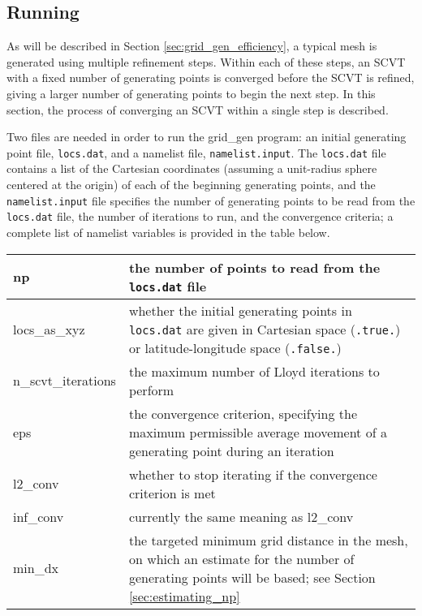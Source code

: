 \subsection{Running}

As will be described in Section \ref{sec:grid_gen_efficiency}, a typical mesh is generated using multiple refinement steps. Within each of these steps, an SCVT with a fixed
number of generating points is converged before the SCVT is refined, giving a larger number of generating points to begin the next step. In this section, the process of converging an SCVT within a single step is described.

Two files are needed in order to run the grid\_gen program: an initial generating point file, {\tt locs.dat}, and a                        
namelist file, {\tt namelist.input}. The {\tt locs.dat} file contains a list of the Cartesian coordinates (assuming a unit-radius sphere
centered at the origin) of each of the beginning generating points, and the {\tt namelist.input} file specifies the number of generating points to be read from the {\tt locs.dat} file, the number of iterations to run, and the convergence criteria; a complete list of namelist variables is provided in the table below.

\vspace{12pt}
\begin{longtable}{|p{1.25in} |p{4.5in}|}
\hline
np & the number of points to read from the {\tt locs.dat} file \\ \hline
locs\_as\_xyz & whether the initial generating points in {\tt locs.dat} are given in Cartesian space ({\tt .true.}) or latitude-longitude space ({\tt .false.}) \\ \hline
n\_scvt\_iterations & the maximum number of Lloyd iterations to perform \\ \hline
eps & the convergence criterion, specifying the maximum permissible average movement of a generating point during an iteration \\ \hline
l2\_conv & whether to stop iterating if the convergence criterion is met \\ \hline
inf\_conv & currently the same meaning as l2\_conv \\ \hline
min\_dx & the targeted minimum grid distance in the mesh, on which an estimate for the number of generating points will be based; see Section \ref{sec:estimating_np} \\ \hline
\end{longtable}
\vspace{12pt}

